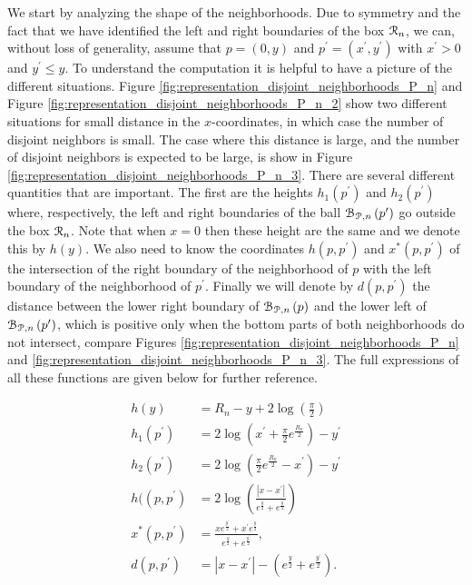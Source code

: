 We start by analyzing the shape of the neighborhoods. Due to symmetry and the fact that we have identified the left and right boundaries of the box ${\mathcal R}_n$, we can, without loss of generality, assume that $p = (0,y)$ and $p^\prime = (x^\prime,y^\prime)$ with $x^\prime > 0$ and $y^\prime \le y$. To understand the computation it is helpful to have a picture of the different situations. Figure \ref{fig:representation_disjoint_neighborhoods_P_n} and Figure \ref{fig:representation_disjoint_neighborhoods_P_n_2} show two different situations for small distance in the $x$-coordinates, in which case the number of disjoint neighbors is small. The case where this distance is large, and the number of disjoint neighbors is expected to be large, is show in Figure \ref{fig:representation_disjoint_neighborhoods_P_n_3}. There are several different quantities that are important. The first are the heights $h_1(p^\prime)$ and $h_2(p^\prime)$ where, respectively, the left and right boundaries of the ball ${\mathcal B}_{{\mathcal P},n}\left(p^\prime\right)$ go outside the box ${\mathcal R}_n$. Note that when $x = 0$ then these height are the same and we denote this by $h(y)$. We also need to know the coordinates $h(p,p^\prime)$ and $x^\ast(p,p^\prime)$ of the intersection of the right boundary of the neighborhood of $p$ with the left boundary of the neighborhood of $p^\prime$. Finally we will denote by $d(p,p^\prime)$ the distance between the lower right boundary of ${\mathcal B}_{{\mathcal P},n}\left(p\right)$ and the lower left of ${\mathcal B}_{{\mathcal P},n}\left(p^\prime\right)$, which is positive only when the bottom parts of both neighborhoods do not intersect, compare Figures \ref{fig:representation_disjoint_neighborhoods_P_n} and \ref{fig:representation_disjoint_neighborhoods_P_n_3}. The full expressions of all these functions are given below for further reference.

\begin{align}
	h(y) &= R_n - y + 2\log\left(\frac{\pi}{2}\right) \label{eq:def_height_y_P_n}\\
	h_1(p^\prime) &= 2\log\left(x^\prime + \frac{\pi}{2}e^{\frac{R_n}{2}}\right) - y^\prime \label{eq:def_height_left_P_n} \\
	h_2(p^\prime) &= 2\log\left(\frac{\pi}{2}e^{\frac{R_n}{2}} - x^\prime\right) - y^\prime 
		\label{eq:def_height_right_P_n} \\
	h((p,p^\prime) &= 2\log\left(\frac{|x - x^\prime|}{e^{\frac{y}{2}} + e^{\frac{y^\prime}{2}}}\right)\\
	x^\ast(p,p^\prime) &= \frac{x e^{\frac{y^\prime}{2}} + x^\prime e^{\frac{y}{2}}}{e^{\frac{y}{2}} + 	
		e^{\frac{y^\prime}{2}}},\\
	d(p,p^\prime) &= |x - x^\prime| - \left(e^{\frac{y}{2}} + e^{\frac{y^\prime}{2}}\right).
	\label{eq:def_d_p_p_prime}
\end{align}

